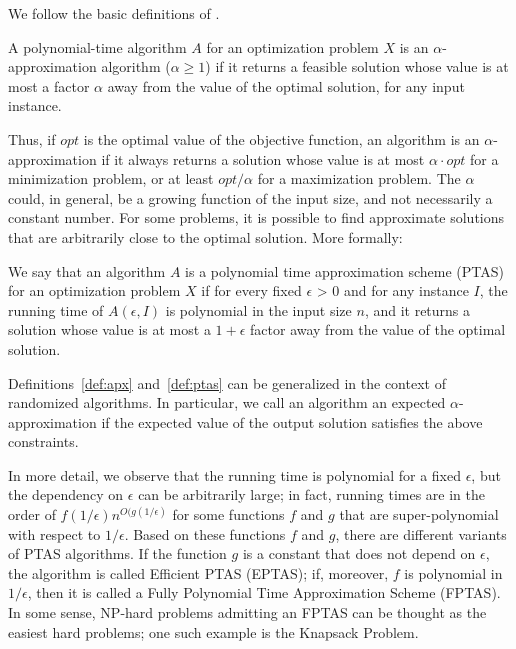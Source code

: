We follow the basic definitions of \cite{vazirani2013approximation}.

\begin{definition}
 A polynomial-time algorithm $A$ for an optimization problem $X$
is an $\alpha$-approximation algorithm ($\alpha \ge 1$) if it returns a feasible solution whose value is
at most a factor $\alpha$ away from the value of the optimal solution, for any input
instance.
\label{def:apx}
\end{definition}

Thus, if $opt$ is the optimal value of the objective function, an algorithm is an $\alpha$-approximation if it always returns a
solution whose value is at most $\alpha \cdot opt$ for a minimization problem, or at least
$opt/\alpha$ for a maximization problem.
The $\alpha$ could, in general, be a growing function of the input size, and
not necessarily a constant number.
For some problems, it is possible to find approximate solutions that are
arbitrarily close to the optimal solution. More formally:

\begin{definition}
 We say that an algorithm $A$ is a polynomial time approximation
scheme (PTAS) for an optimization problem $X$ if for every fixed $\epsilon$ > 0 and for
any instance $I$, the running time of $A(\epsilon, I)$ is polynomial in the input size $n$,
and it returns a solution whose value is at most a $1 + \epsilon$ factor away from the
value of the optimal solution.
\label{def:ptas}
\end{definition}


Definitions~\ref{def:apx} and~\ref{def:ptas} can be generalized in the context of randomized algorithms.
In particular, we call an algorithm an expected
$\alpha$-approximation if the expected value of the output solution satisfies the above
constraints.

In more detail, we observe that the running time is polynomial for a fixed $\epsilon$, but the dependency
on $\epsilon$ can be arbitrarily large; in fact, running times are in the order of $f(1/\epsilon)n ^{O(g(1/\epsilon)}$ for some functions $f$ and $g$ that are super-polynomial with
respect to $1/\epsilon$. Based on these functions $f$ and $g$, there are different variants of PTAS algorithms.
If the function $g$ is a constant that does not depend
on $\epsilon$, the algorithm is called Efficient PTAS (EPTAS); if, moreover, $f$
is polynomial in $1/\epsilon$, then it is called a Fully Polynomial Time Approximation
Scheme (FPTAS). In some sense, NP-hard problems admitting an FPTAS can
be thought as the easiest hard problems; one such example is the Knapsack
Problem.

